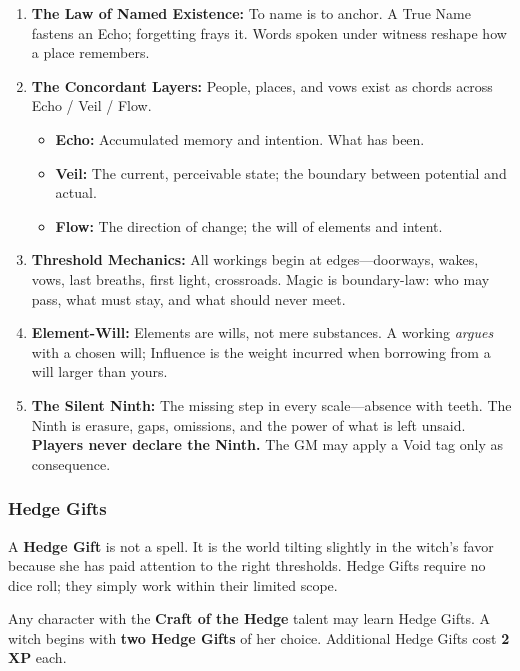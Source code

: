 \begin{enumerate}
    \item \textbf{The Law of Named Existence:} To name is to anchor. A True Name fastens an Echo; forgetting frays it. Words spoken under witness reshape how a place remembers.
    \item \textbf{The Concordant Layers:} People, places, and vows exist as chords across Echo / Veil / Flow.
    \begin{itemize}
        \item \textbf{Echo:} Accumulated memory and intention. What has been.
        \item \textbf{Veil:} The current, perceivable state; the boundary between potential and actual.
        \item \textbf{Flow:} The direction of change; the will of elements and intent.
    \end{itemize}
    \item \textbf{Threshold Mechanics:} All workings begin at edges---doorways, wakes, vows, last breaths, first light, crossroads. Magic is boundary-law: who may pass, what must stay, and what should never meet.
    \item \textbf{Element-Will:} Elements are wills, not mere substances. A working \textit{argues} with a chosen will; Influence is the weight incurred when borrowing from a will larger than yours.
    \item \textbf{The Silent Ninth:} The missing step in every scale---absence with teeth. The Ninth is erasure, gaps, omissions, and the power of what is left unsaid. \textbf{Players never declare the Ninth.} The GM may apply a Void tag only as consequence.
\end{enumerate}

\subsubsection{Hedge Gifts}

A \textbf{Hedge Gift} is not a spell. It is the world tilting slightly in the witch's favor because she has paid attention to the right thresholds. Hedge Gifts require no dice roll; they simply work within their limited scope.

Any character with the \textbf{Craft of the Hedge} talent may learn Hedge Gifts. A witch begins with \textbf{two Hedge Gifts} of her choice. Additional Hedge Gifts cost \textbf{2 XP} each.

